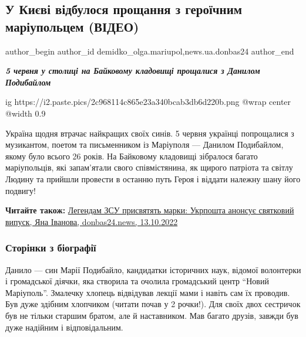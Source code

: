  
 
 
 
 
 
\subsection{У Києві відбулося прощання з героїчним маріупольцем (ВІДЕО)}
\label{sec:06_06_2023.stz.news.ua.donbas24.1.u_kievi_vidbulos_proschannja_iz_geroichnym_mariupolcem}
 
\ifcmt
 author_begin
   author_id demidko_olga.mariupol,news.ua.donbas24
 author_end
\fi

\begin{center}
\Large\em\bfseries\color{blue}
5 червня у столиці на Байковому кладовищі прощалися з Данилом Подибайлом
\end{center}

\ifcmt
  ig https://i2.paste.pics/2c968114c865e23a340bcab3db6d220b.png
  @wrap center
  @width 0.9
\fi

Україна щодня втрачає найкращих своїх синів. 5 червня українці попрощалися з
музикантом, поетом та письменником із Маріуполя — Данилом Подибайлом, якому
було всього 26 років. На Байковому кладовищі зібралося багато маріупольців, які
запам'ятали свого співмістянина, як щирого патріота та світлу Людину та прийшли
провести в останню путь Героя і віддати належну шану його подвигу!

\textbf{Читайте також:} \href{https://donbas24.news/news/legendam-zsu-prisvyatyat-marki-ukrposta-anonsuje-svyatkovii-vipusk}{%
Легендам ЗСУ присвятять марки: Укрпошта анонсує святковий випуск, Яна Іванова, donbas24.news, 13.10.2022}

\subsubsection{Сторінки з біографії}

Данило — син Марії Подибайло, кандидатки історичних наук, відомої волонтерки і
громадської діячки, яка створила та очолила громадський центр \enquote{Новий
Маріуполь}. Змалечку хлопець відвідував лекції мами і навіть сам їх проводив.
Був дуже здібним хлопчиком (читати почав у 2 рочки!). Для своїх двох сестричок
був не тільки старшим братом, але й наставником. Мав багато друзів, завжди був
дуже надійним і відповідальним. 

